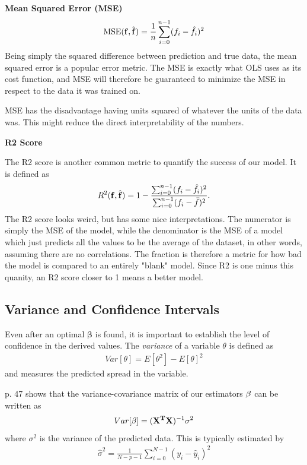 \documentclass[10pt, twocolumn]{article}
\renewcommand{\b}{\boldsymbol}
\begin{document}
\textbf{Mean Squared Error (MSE)}
\begin{align}
    \text{MSE}(\vb{f}, \hat{\vb{f}}) = \frac{1}{n}\sum\limits_{i=0}^{n-1}(f_i - \hat{f}_i)^2
    \label{eq:MSE}
\end{align}
Being simply the squared difference between prediction and true data, the mean squared error is a popular error metric. The MSE is exactly what OLS uses as its cost function, and MSE will therefore be guaranteed to minimize the MSE in respect to the data it was trained on.

MSE has the disadvantage having units squared of whatever the units of the data was. This might reduce the direct interpretability of the numbers.

\textbf{R2 Score}

The R2 score is another common metric to quantify the success of our model. It is defined as
\begin{align}
    R^2(\vb{f}, \hat{\vb{f}}) = 1 - \dfrac{\sum_{i=0}^{n-1} (f_i - \hat{f}_i)^2}{\sum_{i=0}^{n-1}(f_i - \bar{f})^2}.
\end{align}
The R2 score looks weird, but has some nice interpretations. The numerator is simply the MSE of the model, while the denominator is the MSE of a model which just predicts all the values to be the average of the dataset, in other words, assuming there are no correlations. The fraction is therefore a metric for how bad the model is compared to an entirely "blank" model. Since R2 is one minus this quanity, an R2 score closer to 1 means a better model.



\subsection{Variance and Confidence Intervals}
\label{subsec:confidence_intervals_method}
Even after an optimal $\b \beta$ is found, it is important to establish the level of confidence in the derived values. The \textit{variance} of a variable $\theta$ is defined as
\begin{align}
    Var[\theta] = E[\theta^2] - E[\theta]^2
\end{align}
and measures the predicted spread in the variable.

\citep{ESL} p. 47 shows that the variance-covariance matrix of our estimators $\vb{\beta}$ can be written as
\begin{align}
    Var[\vb{\beta}] = (\vb{X^T}\vb{X})^{-1}\sigma^2
\end{align}
where $\sigma^2$ is the variance of the predicted data. This is typically estimated by
\begin{align}
    \hat{\sigma}^2 = \frac{1}{N-p-1}\sum\limits_{i=0}^{N-1}(y_i - \hat{y}_i)^2
\end{align}
\end{document}
